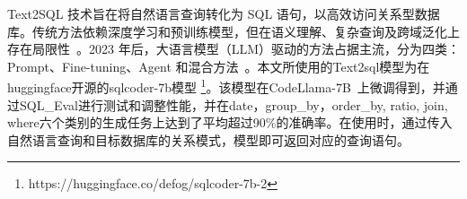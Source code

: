 \begin{CJK*}{UTF8}{song}

Text2SQL 技术旨在将自然语言查询转化为 SQL 语句，以高效访问关系型数据库。传统方法依赖深度学习和预训练模型，但在语义理解、复杂查询及跨域泛化上存在局限性~\cite{3}。2023 年后，大语言模型（LLM）驱动的方法占据主流，分为四类：Prompt、Fine-tuning、Agent 和混合方法~\cite{7,8,9}。本文所使用的Text2sql模型为在huggingface开源的sqlcoder-7b模型 \footnote{https://huggingface.co/defog/sqlcoder-7b-2}。该模型在CodeLlama-7B~\cite{10}上微调得到，并通过SQL\_Eval进行测试和调整性能，并在date，group\_by，order\_by, ratio, join, where六个类别的生成任务上达到了平均超过90\%的准确率。在使用时，通过传入自然语言查询和目标数据库的关系模式，模型即可返回对应的查询语句。

\end{CJK*}